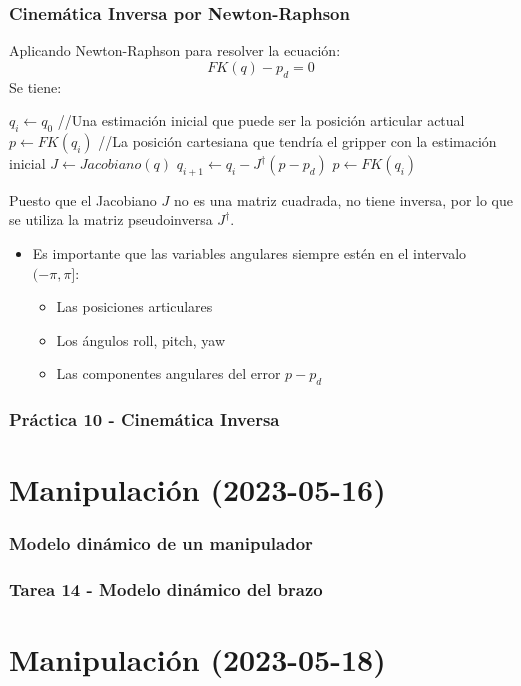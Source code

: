 \begin{frame}\frametitle{Cinemática Inversa por Newton-Raphson}
  Aplicando Newton-Raphson para resolver la ecuación:
  \[FK(q) - p_d = 0\]
  Se tiene:
  \begin{algorithm}[H]
    \DontPrintSemicolon
    $q_i \leftarrow q_0$ //Una estimación inicial que puede ser la posición articular actual\;
    $p \leftarrow FK(q_i)$ //La posición cartesiana que tendría el gripper con la estimación inicial\;
    {
      $J \leftarrow Jacobiano(q)$     \;
      $q_{i+1} \leftarrow q_i - J^\dagger (p - p_d)$\;
      $p \leftarrow FK(q_i)$ 
    }
  \end{algorithm}
  Puesto que el Jacobiano $J$ no es una matriz cuadrada, no tiene inversa, por lo que se utiliza la matriz pseudoinversa $J^\dagger$. 
  \begin{itemize}
  \item Es importante que las variables angulares siempre estén en el intervalo $(-\pi, \pi]$:
    \begin{itemize}
    \item Las posiciones articulares
    \item Los ángulos roll, pitch, yaw
    \item Las componentes angulares del error $p - p_d$
    \end{itemize}
  \end{itemize}
\end{frame}

\begin{frame}\frametitle{Práctica 10 - Cinemática Inversa}
\end{frame}

\section{Manipulación (2023-05-16)}

\begin{frame}\frametitle{Modelo dinámico de un manipulador}
\end{frame}

\begin{frame}\frametitle{Tarea 14 - Modelo dinámico del brazo}
\end{frame}

\section{Manipulación (2023-05-18)}

